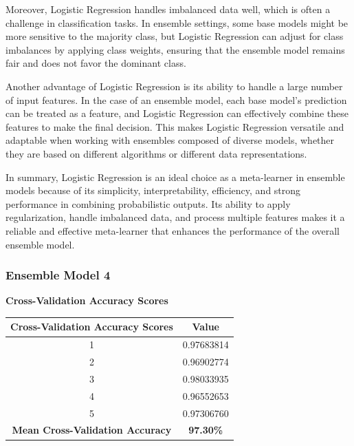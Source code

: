 \vspace{1em}

\noindent
Moreover, Logistic Regression handles imbalanced data well, which is often a challenge in classification tasks. In ensemble settings, some base models might be more sensitive to the majority class, but Logistic Regression can adjust for class imbalances by applying class weights, ensuring that the ensemble model remains fair and does not favor the dominant class.

\vspace{1em}

\noindent
Another advantage of Logistic Regression is its ability to handle a large number of input features. In the case of an ensemble model, each base model's prediction can be treated as a feature, and Logistic Regression can effectively combine these features to make the final decision. This makes Logistic Regression versatile and adaptable when working with ensembles composed of diverse models, whether they are based on different algorithms or different data representations.

\vspace{1em}

\noindent
In summary, Logistic Regression is an ideal choice as a meta-learner in ensemble models because of its simplicity, interpretability, efficiency, and strong performance in combining probabilistic outputs. Its ability to apply regularization, handle imbalanced data, and process multiple features makes it a reliable and effective meta-learner that enhances the performance of the overall ensemble model.

\subsubsection{Ensemble Model 4}

\begin{center}
    \textbf{Cross-Validation Accuracy Scores} \\[0.5em]
    \begin{tabular}{|c|c|}
        \hline
        \textbf{Cross-Validation Accuracy Scores} & \textbf{Value} \\ \hline
        1 & 0.97683814 \\ \hline
        2 & 0.96902774 \\ \hline
        3 & 0.98033935 \\ \hline
        4 & 0.96552653 \\ \hline
        5 & 0.97306760 \\ \hline
        \textbf{Mean Cross-Validation Accuracy} & \textbf{97.30\%} \\ \hline
    \end{tabular}
\end{center}


